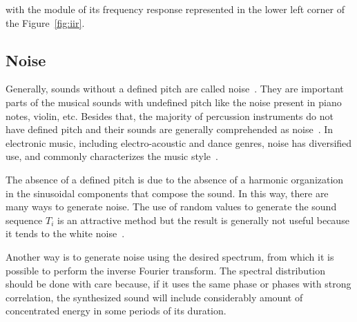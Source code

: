 \documentclass[
 aip,
 jmp,
 amsmath,amssymb,
 reprint,
]{revtex4-1}
\begin{document}
\begin{enumerate}
\noindent with the module of its frequency response represented in the lower left corner of the Figure~\ref{fig:iir}.


\end{enumerate}

\subsection{Noise}\label{subsec:ruidos}

Generally, sounds without a defined pitch are called noise~\cite{Lacerda}.
They are important parts of the musical sounds with undefined pitch like the noise present in piano notes, violin, etc. Besides that, the majority of percussion instruments do not have defined pitch and their sounds are generally comprehended as noise~\cite{Roederer}. In electronic music, including electro-acoustic and dance genres, noise has diversified use, and commonly characterizes the music style~\cite{Cook}. 

The absence of a defined pitch is due to the absence of a harmonic organization in the sinusoidal components that compose the sound.
In this way, there are many ways to generate noise.
The use of random values to generate the sound sequence $T_i$ is an attractive method but the result is generally not useful because it tends to the white noise~\cite{Cook}.

Another way is to generate noise using the desired spectrum, from which it is possible to perform the inverse Fourier transform.
The spectral distribution should be done with care because, if it uses the same phase or phases with strong correlation, the synthesized sound will include considerably amount of concentrated energy in some periods of its duration.
\end{document}
